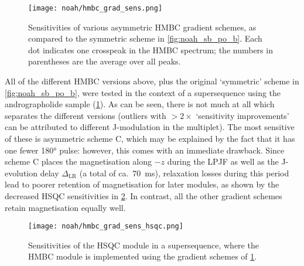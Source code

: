 \begin{figure}[htb]
    \centering
    \texttt{[image: noah/hmbc\_grad\_sens.png]}%
    \caption[Comparison of relative sensitivities of HMBC gradient schemes]{
        Sensitivities of various asymmetric HMBC gradient schemes, as compared to the symmetric scheme in \cref{fig:noah_sb_po_b}.
        Each dot indicates one crosspeak in the HMBC spectrum; the numbers in parentheses are the average over all peaks.
    }
    \label{fig:hmbc_grad_sens}
\end{figure}

All of the different HMBC versions above, plus the original `symmetric' scheme in \cref{fig:noah_sb_po_b}, were tested in the context of a  supersequence using the andrographolide sample (\cref{fig:hmbc_grad_sens}).
As can be seen, there is not much at all which separates the different versions (outliers with $>2\times$ `sensitivity improvements' can be attributed to different J-modulation in the multiplet).
The most sensitive of these is asymmetric scheme C, which may be explained by the fact that it has one fewer \ang{180} pulse: however, this comes with an immediate drawback.
Since scheme C places the  magnetisation along $-z$ during the LPJF as well as the J-evolution delay $\Delta_\text{LR}$ (a total of ca.\ \qty{70}{\ms}), relaxation losses during this period lead to poorer retention of  magnetisation for later modules, as shown by the decreased HSQC sensitivities in \cref{fig:hmbc_grad_sens_hsqc}.
In contrast, all the other gradient schemes retain  magnetisation equally well.

\begin{figure}[htb]
    \centering
    \texttt{[image: noah/hmbc\_grad\_sens\_hsqc.png]}%
    \caption[Effect of HMBC gradient scheme on HSQC sensitivity in a  supersequence]{
        Sensitivities of the HSQC module in a  supersequence, where the HMBC module is implemented using the gradient schemes of \cref{fig:hmbc_grad_sens}.
    }
    \label{fig:hmbc_grad_sens_hsqc}
\end{figure}

